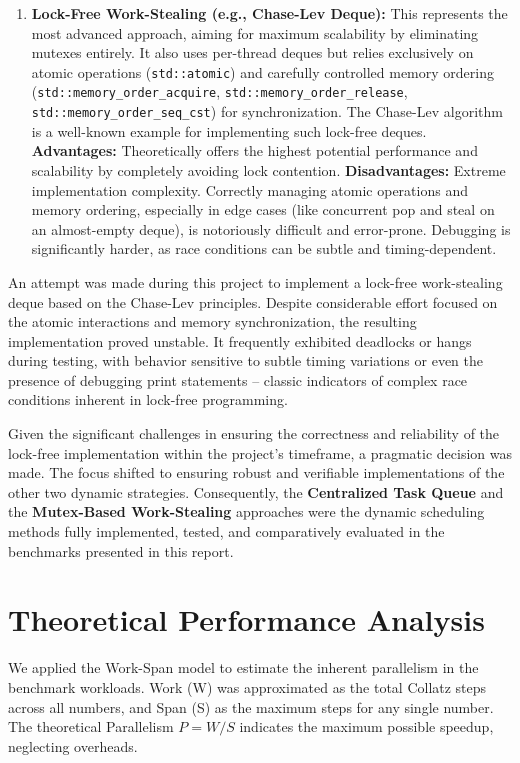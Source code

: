 \documentclass[10pt]{article}
\newcommand{\code}[1]{\texttt{#1}} %
\begin{document}
\begin{enumerate}
    \item \textbf{Lock-Free Work-Stealing (e.g., Chase-Lev Deque):} This represents the most advanced approach, aiming for maximum scalability by eliminating mutexes entirely. It also uses per-thread deques but relies exclusively on atomic operations (\code{std::atomic}) and carefully controlled memory ordering (\code{std::memory\_order\_acquire}, \code{std::memory\_order\_release}, \code{std::memory\_order\_seq\_cst}) for synchronization. The Chase-Lev algorithm is a well-known example for implementing such lock-free deques.
          \textbf{Advantages:} Theoretically offers the highest potential performance and scalability by completely avoiding lock contention.
          \textbf{Disadvantages:} Extreme implementation complexity. Correctly managing atomic operations and memory ordering, especially in edge cases (like concurrent pop and steal on an almost-empty deque), is notoriously difficult and error-prone. Debugging is significantly harder, as race conditions can be subtle and timing-dependent.
\end{enumerate}

An attempt was made during this project to implement a lock-free work-stealing deque based on the Chase-Lev principles. Despite considerable effort focused on the atomic interactions and memory synchronization, the resulting implementation proved unstable. It frequently exhibited deadlocks or hangs during testing, with behavior sensitive to subtle timing variations or even the presence of debugging print statements – classic indicators of complex race conditions inherent in lock-free programming.

Given the significant challenges in ensuring the correctness and reliability of the lock-free implementation within the project's timeframe, a pragmatic decision was made. The focus shifted to ensuring robust and verifiable implementations of the other two dynamic strategies. Consequently, the \textbf{Centralized Task Queue} and the \textbf{Mutex-Based Work-Stealing} approaches were the dynamic scheduling methods fully implemented, tested, and comparatively evaluated in the benchmarks presented in this report.


\section{Theoretical Performance Analysis}

We applied the Work-Span model to estimate the inherent parallelism in the benchmark workloads. Work (W) was approximated as the total Collatz steps across all numbers, and Span (S) as the maximum steps for any single number. The theoretical Parallelism $P = W/S$ indicates the maximum possible speedup, neglecting overheads.
\end{document}
